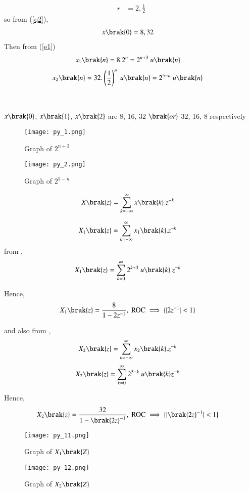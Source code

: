 \documentclass[beamer]{IEEEtran}
\theoremstyle{remark}
\begin{document}
\begin{align}
\label{q3}
r&=2,\frac{1}{2}
\end{align}
so from (\ref{q2}),
\begin{align}x\brak{0}&=8,32\end{align}
Then from (\ref{e1})
\begin{align}
    \label{a11}
    x_{1}\brak{n}&=8.2^{n}=2^{n+3}\ u\brak{n}
\end{align}
\begin{align}
    \label{a12}
    x_{2}\brak{n}=32.\left(\frac{1}{2}\right)^{n}\ u\brak{n}&=2^{5-n}\ u\brak{n}
\end{align}\\\\
$x\brak{0}$, $x\brak{1}$, $x\brak{2}$ are 8, 16, 32 $\brak{or}$ 32, 16, 8 respectively
\begin{figure}[h]
    \centering
    \texttt{[image: py\_1.png]}
    \label{$2^{n+3}$}
    \caption*{Graph of $2^{n+3}$ }
\end{figure}
\begin{figure}[h]
    \centering
    \texttt{[image: py\_2.png]}
    \caption*{Graph of $2^{5-n}$}
    \label{$2^{5-n}$}
\end{figure}
\begin{align}
\label{a13}
    X\brak{z}&=\sum_{k=-\infty}^{\infty} x\brak{k}.z^{-k}
\end{align}

\begin{align}
\label{a14}
    X_1\brak{z}&=\sum_{k=-\infty}^{\infty} x_1\brak{k}.z^{-k}
\end{align}
from \brak{\ref{a11}},
\begin{align}X_1\brak{z}&=\sum_{k=0}^{\infty}2^{k+3}\ u\brak{k}\ z^{-k}\end{align}

Hence,
\begin{align}
X_1\brak{z}&=\frac{8}{1-2z^{-1}},\ \text{ROC}\implies\{|2z^{-1}|<1\}
\end{align}

and also from \brak{\ref{a12}},\\
\begin{align}
    X_2\brak{z}&=\sum_{k=-\infty}^{\infty} x_2\brak{k}.z^{-k}
\end{align}
\begin{align}X_2\brak{z}&=\sum_{k=0}^{\infty} 2^{5-k}\ u\brak{k}z^{-k}\end{align}

Hence,
\begin{align}X_2\brak{z}&=\frac{32}{1-{\brak{2z}^{-1}}},\ \text{ROC}\implies\{|{\brak{2z}^{-1}}|<1\} \end{align}
\begin{figure}[h]
    \centering
    \texttt{[image: py\_11.png]}
    \label{$X_1(Z)$}
    \caption*{Graph of $X_1\brak{Z}$}
\end{figure}
\begin{figure}[h]
    \centering
    \texttt{[image: py\_12.png]}
    \label{$X_2(Z)$}
    \caption*{Graph of $X_2\brak{Z}$}
\end{figure}
\end{document}

